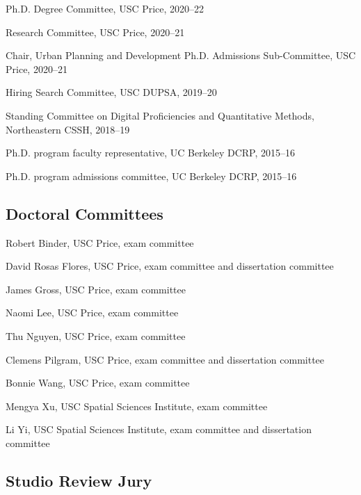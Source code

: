 \documentclass[12pt,letterpaper]{report}
\newcommand{\listitemspace}{0.25em}
\renewenvironment{itemize}
{\begin{list}{}{\setlength{\leftmargin}{0em}
                \setlength{\parskip}{0em}
                \setlength{\itemsep}{\listitemspace}
                \setlength{\parsep}{\listitemspace}}}
{\end{list}}
\begin{document}
    \begin{itemize}

        \item Ph.D. Degree Committee, USC Price, 2020--22
        \item Research Committee, USC Price, 2020--21
        \item Chair, Urban Planning and Development Ph.D. Admissions Sub-Committee, USC Price, 2020--21
        \item Hiring Search Committee, USC DUPSA, 2019--20
        \item Standing Committee on Digital Proficiencies and Quantitative Methods, Northeastern CSSH, 2018--19
        \item Ph.D. program faculty representative, UC Berkeley DCRP, 2015--16
        \item Ph.D. program admissions committee, UC Berkeley DCRP, 2015--16

    \end{itemize}

    \subsection*{Doctoral Committees}

    \begin{itemize}

        \item Robert Binder, USC Price, exam committee
        \item David Rosas Flores, USC Price, exam committee and dissertation committee
        \item James Gross, USC Price, exam committee
        \item Naomi Lee, USC Price, exam committee
        \item Thu Nguyen, USC Price, exam committee
        \item Clemens Pilgram, USC Price, exam committee and dissertation committee
        \item Bonnie Wang, USC Price, exam committee
        \item Mengya Xu, USC Spatial Sciences Institute, exam committee
        \item Li Yi, USC Spatial Sciences Institute, exam committee and dissertation committee

    \end{itemize}

    \subsection*{Studio Review Jury}
\end{document}
